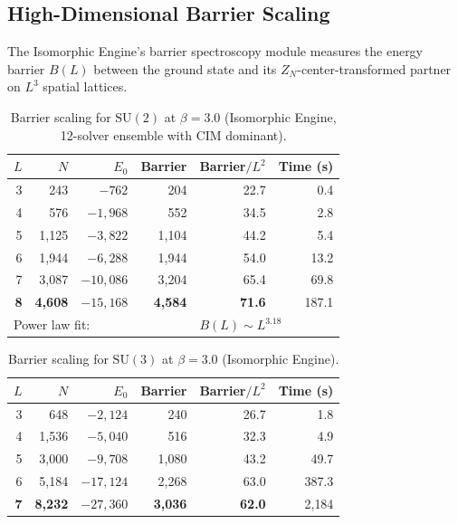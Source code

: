 \documentclass[11pt,a4paper]{article}
\theoremstyle{plain}
\theoremstyle{remark}
\newcommand{\SU}{\mathrm{SU}}
\begin{document}
\subsection{High-Dimensional Barrier Scaling}

The Isomorphic Engine's barrier spectroscopy module measures the energy
barrier $B(L)$ between the ground state and its $Z_N$-center-transformed
partner on $L^3$ spatial lattices.

\begin{table}[H]
\centering
\caption{Barrier scaling for $\SU(2)$ at $\beta = 3.0$ (Isomorphic Engine,
  12-solver ensemble with CIM dominant).}
\label{tab:barrier-su2}
\smallskip
\begin{tabular}{rrrrrr}
\toprule
$L$ & $N$ & $E_0$ & Barrier & Barrier$/L^2$ & Time (s) \\
\midrule
3 & 243 & $-762$ & 204 & 22.7 & 0.4 \\
4 & 576 & $-1{,}968$ & 552 & 34.5 & 2.8 \\
5 & 1{,}125 & $-3{,}822$ & 1{,}104 & 44.2 & 5.4 \\
6 & 1{,}944 & $-6{,}288$ & 1{,}944 & 54.0 & 13.2 \\
7 & 3{,}087 & $-10{,}086$ & 3{,}204 & 65.4 & 69.8 \\
\textbf{8} & \textbf{4{,}608} & $-15{,}168$ & \textbf{4{,}584} & \textbf{71.6} & 187.1 \\
\midrule
\multicolumn{4}{l}{Power law fit:} & \multicolumn{2}{l}{$B(L) \sim L^{3.18}$} \\
\bottomrule
\end{tabular}
\end{table}

\begin{table}[H]
\centering
\caption{Barrier scaling for $\SU(3)$ at $\beta = 3.0$ (Isomorphic Engine).}
\label{tab:barrier-su3}
\smallskip
\begin{tabular}{rrrrrr}
\toprule
$L$ & $N$ & $E_0$ & Barrier & Barrier$/L^2$ & Time (s) \\
\midrule
3 & 648 & $-2{,}124$ & 240 & 26.7 & 1.8 \\
4 & 1{,}536 & $-5{,}040$ & 516 & 32.3 & 4.9 \\
5 & 3{,}000 & $-9{,}708$ & 1{,}080 & 43.2 & 49.7 \\
6 & 5{,}184 & $-17{,}124$ & 2{,}268 & 63.0 & 387.3 \\
\textbf{7} & \textbf{8{,}232} & $-27{,}360$ & \textbf{3{,}036} & \textbf{62.0} & 2{,}184 \\
\bottomrule
\end{tabular}
\end{table}
\end{document}

